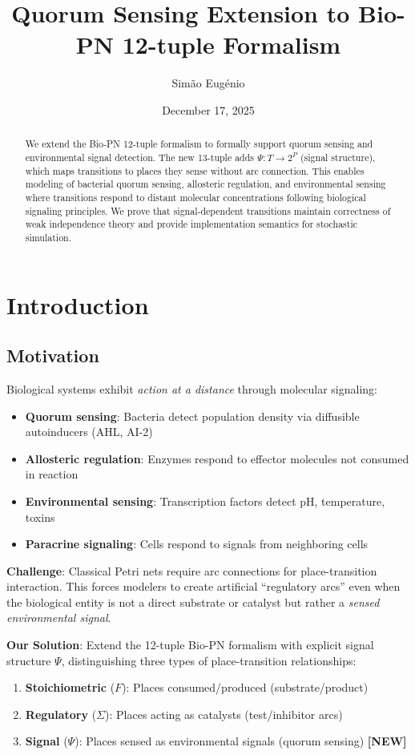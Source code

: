 \documentclass[11pt]{article}
\title{Quorum Sensing Extension to Bio-PN 12-tuple Formalism}
\author{Simão Eugénio}
\date{December 17, 2025}
\begin{document}
\maketitle

\begin{abstract}
We extend the Bio-PN 12-tuple formalism to formally support quorum sensing and environmental signal detection. The new 13-tuple adds $\Psi: T \to 2^P$ (signal structure), which maps transitions to places they sense without arc connection. This enables modeling of bacterial quorum sensing, allosteric regulation, and environmental sensing where transitions respond to distant molecular concentrations following biological signaling principles. We prove that signal-dependent transitions maintain correctness of weak independence theory and provide implementation semantics for stochastic simulation.
\end{abstract}

\section{Introduction}

\subsection{Motivation}

Biological systems exhibit \emph{action at a distance} through molecular signaling:
\begin{itemize}
    \item \textbf{Quorum sensing}: Bacteria detect population density via diffusible autoinducers (AHL, AI-2)
    \item \textbf{Allosteric regulation}: Enzymes respond to effector molecules not consumed in reaction
    \item \textbf{Environmental sensing}: Transcription factors detect pH, temperature, toxins
    \item \textbf{Paracrine signaling}: Cells respond to signals from neighboring cells
\end{itemize}

\textbf{Challenge}: Classical Petri nets require arc connections for place-transition interaction. This forces modelers to create artificial ``regulatory arcs'' even when the biological entity is not a direct substrate or catalyst but rather a \emph{sensed environmental signal}.

\textbf{Our Solution}: Extend the 12-tuple Bio-PN formalism with explicit signal structure $\Psi$, distinguishing three types of place-transition relationships:
\begin{enumerate}
    \item \textbf{Stoichiometric} ($F$): Places consumed/produced (substrate/product)
    \item \textbf{Regulatory} ($\Sigma$): Places acting as catalysts (test/inhibitor arcs)
    \item \textbf{Signal} ($\Psi$): Places sensed as environmental signals (quorum sensing) \textbf{[NEW]}
\end{enumerate}
\end{document}
